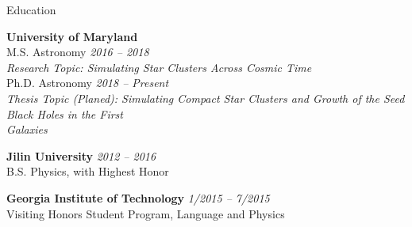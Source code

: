 \documentclass[letterpaper]{resume} %
\begin{document}

\begin{rSection}{Education}

{\bf University of Maryland} \\ 
M.S. Astronomy \hfill {\em 2016 -- 2018} \\
  \vspace{-1mm}
\hspace{6mm} \emph{\small Research Topic: 
Simulating Star Clusters Across Cosmic Time}\\
Ph.D. Astronomy \hfill {\em 2018 -- Present} \\
\vspace{-1mm}
\hspace{6mm} \emph{\small Thesis Topic (Planed): Simulating Compact Star Clusters and Growth of the Seed Black Holes in the First} \\
\vspace{-1mm}
\hspace{6mm} \emph{\small Galaxies}
\item {\bf Jilin University} \hfill {\em 2012 -- 2016} 
\\ B.S. Physics, with Highest Honor %
\item {\bf Georgia Institute of Technology} \hfill {\em 1/2015 --
    7/2015}
\\ Visiting Honors Student Program, Language and Physics

\end{rSection}


\end{document}
